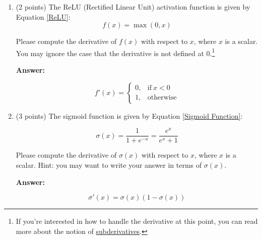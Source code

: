 \documentclass{article}
\newenvironment{answer}{
    {\bf Answer:} \sf \begingroup\color{black}
}{\endgroup}%
\begin{document}
\begin{enumerate}[label=(\alph*)]
    \item (2 points) The ReLU (Rectified Linear Unit) activation function is given by Equation \ref{ReLU}:
          \begin{equation}
              \label{ReLU}
              f(x) = \max(0, x)
          \end{equation}

          Please compute the derivative of $f(x)$ with respect to $x$, where $x$ is a scalar. You may ignore the case that the derivative is not defined at 0.\footnote{If you're interested in how to handle the derivative at this point, you can read more about the notion of \hyperref[https://en.wikipedia.org/wiki/Subderivative]{subderivatives}.}

          \begin{shaded}
              \begin{answer}
                  \begin{equation}
                      f'(x)=
                      \begin{cases}
                          0, & \text{if}\ x < 0 \\
                          1, & \text{otherwise}
                      \end{cases}
                  \end{equation}
              \end{answer}
          \end{shaded}

    \item (3 points) The sigmoid function is given by Equation \ref{Sigmoid Function}:

          \begin{equation}
              \label{Sigmoid Function}
              \sigma (x) = \frac{1}{1 + e^{-x}} = \frac{e^{x}}{e^{x} + 1}
          \end{equation}

          Please compute the derivative of $\sigma(x)$ with respect to $x$, where $x$ is a scalar. Hint: you may want to write your answer in terms of $\sigma(x)$.

          \begin{shaded}
              \begin{answer}
                  \begin{equation}
                      \sigma'(x) = \sigma(x)(1 - \sigma(x))
                  \end{equation}
              \end{answer}
          \end{shaded}


\end{enumerate}
\end{document}
